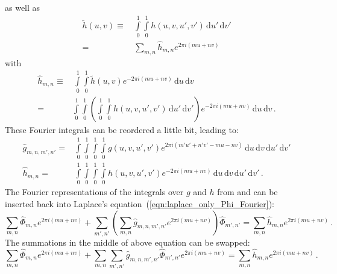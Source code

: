 as well as
\begin{align}
  \tilde{h}(u,v)
  \equiv&\, \int\limits_0^1 \int\limits_0^1
         h(u,v,u',v')
         \,\mathrm{d}u' \,\mathrm{d}v' \nonumber \\
  =&\, \sum\limits_{m,n} \hat{h}_{m,n} e^{2 \pi i (m u + n v)} \label{eqn:fourier_h}
\end{align}
with
\begin{align}
     \hat{h}_{m,n}
  \equiv&\, \int\limits_0^1 \int\limits_0^1
         \tilde{h}(u,v)
         e^{-2 \pi i(m u + n v)}
       \,\mathrm{d}u \,\mathrm{d}v \nonumber \\
  =& \int\limits_0^1 \int\limits_0^1
       \left(
         \int\limits_0^1 \int\limits_0^1
           h(u,v,u',v')
           \,\mathrm{d}u' \,\mathrm{d}v'
       \right)
       e^{-2 \pi i(m u + n v)}
       \,\mathrm{d}u \,\mathrm{d}v \, .
\end{align}
These Fourier integrals can be reordered a little bit, leading to:
\begin{align}
     \hat{g}_{m,n,m',n'}
  =& \int\limits_0^1 \int\limits_0^1
     \int\limits_0^1 \int\limits_0^1
       g(u,v,u',v')
       e^{2 \pi i (m' u' + n' v' - m u - n v)}
       \,\mathrm{d}u \,\mathrm{d}v
       \,\mathrm{d}u' \,\mathrm{d}v' \label{eqn:ft_g} \\
     \hat{h}_{m,n}
  =& \int\limits_0^1 \int\limits_0^1
     \int\limits_0^1 \int\limits_0^1
       h(u,v,u',v')
       e^{-2 \pi i(m u + n v)}
       \,\mathrm{d}u \,\mathrm{d}v
       \,\mathrm{d}u' \,\mathrm{d}v' \label{eqn:ft_h} \, .
\end{align}
The Fourier representations of the integrals over $g$ and $h$ from  and 
can be inserted back into Laplace's equation~(\ref{eqn:laplace_only_Phi_Fourier}):
\begin{equation}
    \sum\limits_{m,n}
    \hat{\Phi}_{m,n} e^{2 \pi i (m u + n v)}
  + \sum\limits_{m',n'}
    \left( \sum\limits_{m,n} \hat{g}_{m,n,m',n'} e^{2 \pi i (m u + n v)} \right)
    \hat{\Phi}_{m',n'}
  = \sum\limits_{m,n} \hat{h}_{m,n} e^{2 \pi i (m u + n v)} \, .
\end{equation}
The summations in the middle of above equation can be swapped:
\begin{equation}
    \sum\limits_{m,n}
      \hat{\Phi}_{m,n}
    e^{2 \pi i (m u + n v)}
  + \sum\limits_{m,n}
      \sum\limits_{m',n'}
      \hat{g}_{m,n,m',n'}
      \hat{\Phi}_{m',n'}
    e^{2 \pi i (m u + n v)}
  = \sum\limits_{m,n}
      \hat{h}_{m,n}
    e^{2 \pi i (m u + n v)} \, .
\end{equation}
